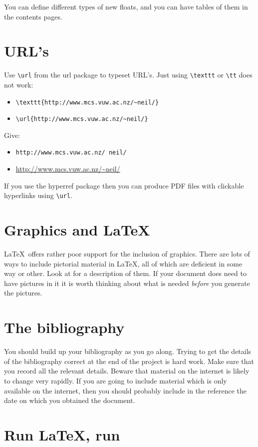 You can define different types of new floats, and you can have tables 
of them in the contents pages.


\section{URL's}
Use \verb=\url= from the \textsf{url} package to typeset URL's. Just 
using \verb+\texttt+ or \verb+\tt+ does not work:

\begin{itemize}
\item \verb+\texttt{http://www.mcs.vuw.ac.nz/~neil/}+
\item \verb+\url{http://www.mcs.vuw.ac.nz/~neil/}+
\end{itemize}

Give:
\begin{itemize}
\item \texttt{http://www.mcs.vuw.ac.nz/~neil/}
\item \url{http://www.mcs.vuw.ac.nz/~neil/}
\end{itemize}
If you use the \textsf{hyperref} package then you can produce PDF 
files with clickable hyperlinks using \verb=\url=.

\section{Graphics and \LaTeX}
\LaTeX\ offers rather poor support for the inclusion of graphics. 
There are lots of ways to include pictorial material in \LaTeX, all 
of which are deficient in some way or other. Look at \cite{GRM97GC} for a 
description of them. If your document does need to have pictures in it 
it is worth thinking about what is needed \emph{before} you generate 
the pictures.

\section{The bibliography}

You should build up your bibliography as you go along.  Trying to get 
the details of the bibliography correct at the end of the project is 
hard work. Make sure that you record all the relevant details. Beware 
that material on the internet is likely to change very rapidly. If you 
are going to include material which is only available on the internet, 
then you should probably include in the reference the date on which 
you obtained the document.

\section{Run \LaTeX, run}

